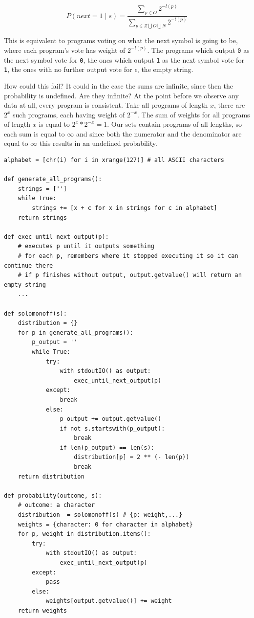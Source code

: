 \documentclass[oneside,hidelinks]{article}
\begin{document}
$$\displaystyle P(next=1 \mid s) = \frac{\sum\limits_{p \in O} 2^{-l(p)}}{\sum\limits_{p \in Z \bigcup O \bigcup N} 2^{-l(p)}}$$

This is equivalent to programs voting on what the next symbol is going to be, where each program's vote has weight of $2^{-l(p)}$.
The programs which output \texttt{0} as the next symbol vote for \texttt{0}, the ones which output \texttt{1} as the next symbol vote for \texttt{1}, the ones with no further output vote for $\epsilon$, the empty string.

How could this fail?
It could in the case the sums are infinite, since then the probability is undefined.
Are they infinite?
At the point before we observe any data at all, every program is consistent.
Take all programs of length $x$, there are $2^x$ such programs, each having weight of $2^{-x}$.
The sum of weights for all programs of length $x$ is equal to $2^x * 2^{-x} = 1$.
Our sets contain programs of all lengths, so each sum is equal to $\infty$ and since both the numerator and the denominator are equal to $\infty$ this results in an undefined probability.

\newpage

\begin{lstlisting}[caption={A naive algorithmic induction implementation, which runs into a problem with infinite sums.}]
alphabet = [chr(i) for i in xrange(127)] # all ASCII characters

def generate_all_programs():
	strings = ['']
	while True:
		strings += [x + c for x in strings for c in alphabet]
	return strings

def exec_until_next_output(p):
	# executes p until it outputs something
	# for each p, remembers where it stopped executing it so it can continue there
	# if p finishes without output, output.getvalue() will return an empty string
	...

def solomonoff(s):
	distribution = {}
	for p in generate_all_programs():
		p_output = ''
		while True:
			try:
				with stdoutIO() as output:
					exec_until_next_output(p)
			except:
				break
			else:
				p_output += output.getvalue()
				if not s.startswith(p_output):
					break
				if len(p_output) == len(s):
					distribution[p] = 2 ** (- len(p))
					break
	return distribution

def probability(outcome, s):
	# outcome: a character
	distribution  = solomonoff(s) # {p: weight,...}
	weights = {character: 0 for character in alphabet}
	for p, weight in distribution.items():
		try:
			with stdoutIO() as output:
				exec_until_next_output(p)
		except:
			pass
		else:
			weights[output.getvalue()] += weight
	return weights
\end{lstlisting}
\end{document}
